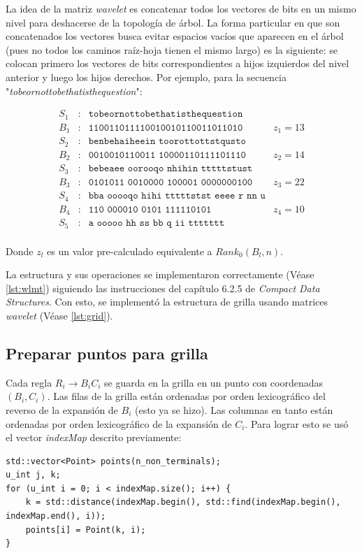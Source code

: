 La idea de la matriz \textit{wavelet} es concatenar todos los vectores de bits en un mismo nivel para deshacerse de la topología de árbol. La forma particular en que son concatenados los vectores busca evitar espacios vacíos que aparecen en el árbol (pues no todos los caminos raíz-hoja tienen el mismo largo) es la siguiente: se colocan primero los vectores de bits correspondientes a hijos izquierdos del nivel anterior y luego los hijos derechos. Por ejemplo, para la secuencia "\textit{tobeornottobethatisthequestion}":

\[
\begin{array}{lcll}
S_1 & : & \texttt{tobeornottobethatisthequestion} & \\
B_1 & : & \texttt{110011011110010010110011011010} & z_1 = 13 \\[10pt]
S_2 & : & \texttt{benbehaiheein toorottottstqusto} & \\
B_2 & : & \texttt{0010010110011 10000110111101110} & z_2 = 14 \\[10pt]
S_3 & : & \texttt{bebeaee oorooqo nhihin tttttstust } & \\
B_3 & : & \texttt{0101011 0010000 100001 0000000100 } & z_3 = 22 \\[10pt]
S_4 & : & \texttt{bba ooooqo hihi tttttstst eeee r nn u} & \\
B_4 & : & \texttt{110 000010 0101 111110101 } & z_4 = 10 \\[10pt]
S_5 & : & \texttt{a ooooo hh ss bb q ii ttttttt} & \\
\end{array}
\]

Donde $z_l$ es un valor pre-calculado equivalente a $Rank_0 (B_{l}, n)$.

La estructura y sus operaciones se implementaron correctamente (Véase \ref{lst:wlmt}) siguiendo las instrucciones del capítulo 6.2.5 de \textit{Compact Data Structures}\cite{Navarro}. Con esto, se implementó la estructura de grilla usando matrices \textit{wavelet}\cite[Capítulo 10.1]{Navarro} (Véase \ref{lst:grid}).

\subsection{Preparar puntos para grilla}

Cada regla $R_i \rightarrow B_i C_i $ se guarda en la grilla en un punto con coordenadas $(B_i, C_i)$. Las filas de la grilla están ordenadas por orden lexicográfico del reverso de la expansión de $B_i$ (esto ya se hizo). Las columnas en tanto están ordenadas por orden lexicográfico de la expansión de $C_i$. Para lograr esto se usó el vector \textit{indexMap} descrito previamente:
\begin{lstlisting}[style=cppstyle] 
std::vector<Point> points(n_non_terminals);
u_int j, k;
for (u_int i = 0; i < indexMap.size(); i++) {
    k = std::distance(indexMap.begin(), std::find(indexMap.begin(), indexMap.end(), i));
    points[i] = Point(k, i);
}    
\end{lstlisting}

